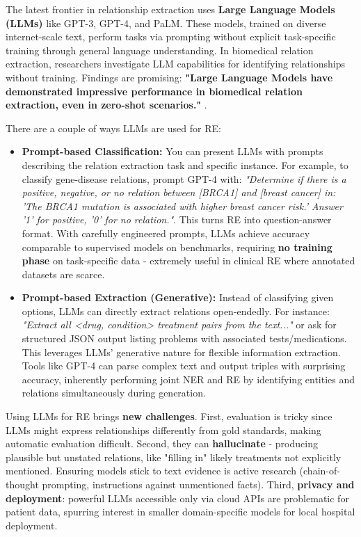 The latest frontier in relationship extraction uses \textbf{Large Language Models (LLMs)} like GPT-3, GPT-4, and PaLM. These models, trained on diverse internet-scale text, perform tasks via prompting without explicit task-specific training through general language understanding. In biomedical relation extraction, researchers investigate LLM capabilities for identifying relationships without training. Findings are promising: \textbf{"Large Language Models have demonstrated impressive performance in biomedical relation extraction, even in zero-shot scenarios."} \cite{Laskar2025}.

There are a couple of ways LLMs are used for RE:

\begin{itemize}
\item \textbf{Prompt-based Classification:} You can present LLMs with prompts describing the relation extraction task and specific instance. For example, to classify gene-disease relations, prompt GPT-4 with: \emph{"Determine if there is a positive, negative, or no relation between [BRCA1] and [breast cancer] in: 'The BRCA1 mutation is associated with higher breast cancer risk.' Answer '1' for positive, '0' for no relation."}. This turns RE into question-answer format. With carefully engineered prompts, LLMs achieve accuracy comparable to supervised models on benchmarks, requiring \textbf{no training phase} on task-specific data - extremely useful in clinical RE where annotated datasets are scarce.

\item \textbf{Prompt-based Extraction (Generative):} Instead of classifying given options, LLMs can directly extract relations open-endedly. For instance: \emph{"Extract all <drug, condition> treatment pairs from the text..."} or ask for structured JSON output listing problems with associated tests/medications. This leverages LLMs' generative nature for flexible information extraction. Tools like GPT-4 can parse complex text and output triples with surprising accuracy, inherently performing joint NER and RE by identifying entities and relations simultaneously during generation.
\end{itemize}

Using LLMs for RE brings \textbf{new challenges}. First, evaluation is tricky since LLMs might express relationships differently from gold standards, making automatic evaluation difficult. Second, they can \textbf{hallucinate} - producing plausible but unstated relations, like "filling in" likely treatments not explicitly mentioned. Ensuring models stick to text evidence is active research (chain-of-thought prompting, instructions against unmentioned facts). Third, \textbf{privacy and deployment}: powerful LLMs accessible only via cloud APIs are problematic for patient data, spurring interest in smaller domain-specific models for local hospital deployment.

